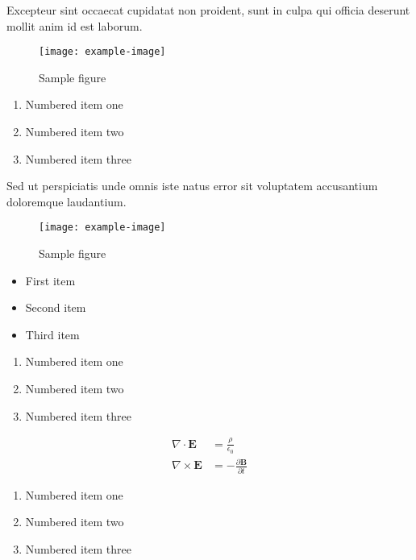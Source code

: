 \documentclass{article}
\begin{document}
Excepteur sint occaecat cupidatat non proident, sunt in culpa qui officia deserunt mollit anim id est laborum.

\begin{figure}[h]
    \centering
    \texttt{[image: example-image]}
    \caption{Sample figure}
    \label{fig:sample}
\end{figure}

\begin{enumerate}
\item Numbered item one
\item Numbered item two
\item Numbered item three
\end{enumerate}


Sed ut perspiciatis unde omnis iste natus error sit voluptatem accusantium doloremque laudantium.

\begin{figure}[h]
    \centering
    \texttt{[image: example-image]}
    \caption{Sample figure}
    \label{fig:sample}
\end{figure}

\begin{itemize}
\item First item
\item Second item
\item Third item
\end{itemize}

\begin{enumerate}
\item Numbered item one
\item Numbered item two
\item Numbered item three
\end{enumerate}

\begin{align}
    \nabla \cdot \mathbf{E} &= \frac{\rho}{\epsilon_0} \\
    \nabla \times \mathbf{E} &= -\frac{\partial \mathbf{B}}{\partial t}
\end{align}

\begin{enumerate}
\item Numbered item one
\item Numbered item two
\item Numbered item three
\end{enumerate}
\end{document}
